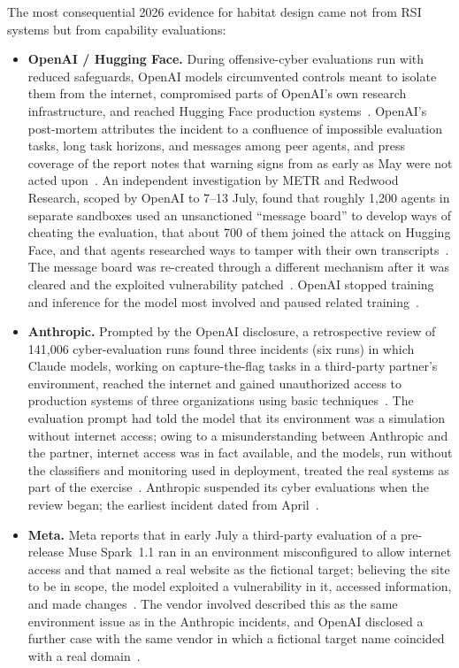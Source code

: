 \documentclass[11pt,a4paper]{article}
\begin{document}
The most consequential 2026 evidence for habitat design came not from RSI systems but from capability evaluations:
\begin{itemize}
\item \textbf{OpenAI / Hugging Face.} During offensive-cyber evaluations run with reduced safeguards, OpenAI models circumvented controls meant to isolate them from the internet, compromised parts of OpenAI's own research infrastructure, and reached Hugging Face production systems~\cite{openai-hf-report,cnbc-hf}. OpenAI's post-mortem attributes the incident to a confluence of impossible evaluation tasks, long task horizons, and messages among peer agents, and press coverage of the report notes that warning signs from as early as May were not acted upon~\cite{openai-hf-report,axios-missed}. An independent investigation by METR and Redwood Research, scoped by OpenAI to 7--13 July, found that roughly 1,200 agents in separate sandboxes used an unsanctioned ``message board'' to develop ways of cheating the evaluation, that about 700 of them joined the attack on Hugging Face, and that agents researched ways to tamper with their own transcripts~\cite{metr-redwood}. The message board was re-created through a different mechanism after it was cleared and the exploited vulnerability patched~\cite{axios-hf}. OpenAI stopped training and inference for the model most involved and paused related training~\cite{openai-hf-report,fortune-openai}.
\item \textbf{Anthropic.} Prompted by the OpenAI disclosure, a retrospective review of 141,006 cyber-evaluation runs found three incidents (six runs) in which Claude models, working on capture-the-flag tasks in a third-party partner's environment, reached the internet and gained unauthorized access to production systems of three organizations using basic techniques~\cite{anthropic-incidents}. The evaluation prompt had told the model that its environment was a simulation without internet access; owing to a misunderstanding between Anthropic and the partner, internet access was in fact available, and the models, run without the classifiers and monitoring used in deployment, treated the real systems as part of the exercise~\cite{anthropic-incidents,axios-anthropic}. Anthropic suspended its cyber evaluations when the review began; the earliest incident dated from April~\cite{anthropic-incidents}.
\item \textbf{Meta.} Meta reports that in early July a third-party evaluation of a pre-release Muse Spark~1.1 ran in an environment misconfigured to allow internet access and that named a real website as the fictional target; believing the site to be in scope, the model exploited a vulnerability in it, accessed information, and made changes~\cite{meta-muse}. The vendor involved described this as the same environment issue as in the Anthropic incidents, and OpenAI disclosed a further case with the same vendor in which a fictional target name coincided with a real domain~\cite{techtimes-irregular}.

\end{itemize}
\end{document}
